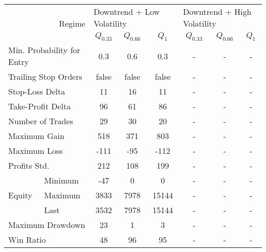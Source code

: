 \centering
\begin{tabular}{ll|cccccc}
    \toprule
    \multicolumn{2}{r|}{\multirow{2}{*}{Regime}} & \multicolumn{3}{l}{Downtrend + Low Volatility}   & \multicolumn{3}{l}{Downtrend + High Volatility}   \\
    \multicolumn{2}{r|}{} & $Q_{0.33}$ & $Q_{0.66}$ & $Q_{1}$ & $Q_{0.33}$ & $Q_{0.66}$ & $Q_{1}$ \\
    \midrule
    \multicolumn{2}{l|}{Min. Probability for Entry} & 0.3 & 0.6 & 0.3 & - & - & - \\
    \multicolumn{2}{l|}{Trailing Stop Orders} & false & false & false & - & - & - \\
    \multicolumn{2}{l|}{Stop-Loss Delta} & 11 & 16 & 11 & - & - & - \\
    \multicolumn{2}{l|}{Take-Profit Delta} & 96 & 61 & 86 & - & - & - \\
    \midrule
    \multicolumn{2}{l|}{Number of Trades} & 29 & 30 & 20 & - & - & - \\
    \multicolumn{2}{l|}{Maximum Gain} & 518 & 371 & 803 & - & - & - \\
    \multicolumn{2}{l|}{Maximum Loss} & -111 & -95 & -112 & - & - & - \\
    \multicolumn{2}{l|}{Profits Std.} & 212 & 108 & 199 & - & - & - \\
    \multirow{3}{*}{Equity} & Minimum & -47  & 0    & 0     & - & - & - \\
    & Maximum & 3833 & 7978 & 15144 & - & - & - \\
    & Last    & 3532 & 7978 & 15144 & - & - & - \\
    \multicolumn{2}{l|}{Maximum Drawdown} & 23 & 1 & 3 & - & - & - \\
    \multicolumn{2}{l|}{Win Ratio} & 48 & 96 & 95 & - & - & - \\
    \bottomrule
\end{tabular}